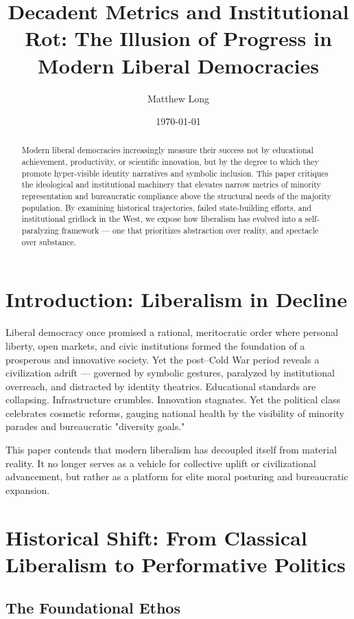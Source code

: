 \documentclass[11pt]{article}
\title{\textbf{Decadent Metrics and Institutional Rot: The Illusion of Progress in Modern Liberal Democracies}}
\author[1]{Matthew Long}
\affil[1]{YonedAI}
\date{\today}
\begin{document}
\maketitle

\begin{abstract}
Modern liberal democracies increasingly measure their success not by educational achievement, productivity, or scientific innovation, but by the degree to which they promote hyper-visible identity narratives and symbolic inclusion. This paper critiques the ideological and institutional machinery that elevates narrow metrics of minority representation and bureaucratic compliance above the structural needs of the majority population. By examining historical trajectories, failed state-building efforts, and institutional gridlock in the West, we expose how liberalism has evolved into a self-paralyzing framework — one that prioritizes abstraction over reality, and spectacle over substance.
\end{abstract}

\section{Introduction: Liberalism in Decline}

Liberal democracy once promised a rational, meritocratic order where personal liberty, open markets, and civic institutions formed the foundation of a prosperous and innovative society. Yet the post–Cold War period reveals a civilization adrift — governed by symbolic gestures, paralyzed by institutional overreach, and distracted by identity theatrics. Educational standards are collapsing. Infrastructure crumbles. Innovation stagnates. Yet the political class celebrates cosmetic reforms, gauging national health by the visibility of minority parades and bureaucratic "diversity goals."

This paper contends that modern liberalism has decoupled itself from material reality. It no longer serves as a vehicle for collective uplift or civilizational advancement, but rather as a platform for elite moral posturing and bureaucratic expansion.

\section{Historical Shift: From Classical Liberalism to Performative Politics}

\subsection{The Foundational Ethos}
\end{document}
